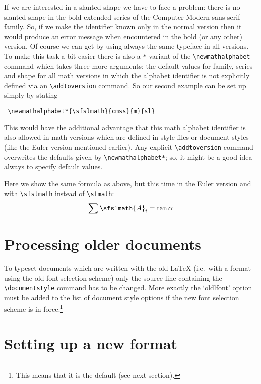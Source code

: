  If we are interested in a slanted shape we have to face a
 problem: there is no slanted shape in the bold extended series of the
 Computer Modern sans serif family.  So, if we make the identifier
 known only in the normal version then it would produce an error message
 when encountered in the bold (or any other) version. Of course we
 can get by
 using always
 the same typeface in all
 versions.  To make this task a bit easier there is also a \verb+*+
  variant
 of the \verb+\newmathalphabet+ command which takes three more
 arguments: the default values for family, series and shape for all
 math versions in which the alphabet identifier is not explicitly
 defined via an \verb+\addtoversion+ command. So our second example
 can be set up simply by stating
\begin{verbatim}
 \newmathalphabet*{\sfslmath}{cmss}{m}{sl}
\end{verbatim}
 This would have the additional advantage that this math alphabet
 identifier is also allowed in math versions which are defined in style
 files or document styles (like the Euler version mentioned earlier).
 Any explicit \verb+\addtoversion+ command overwrites the defaults
 given by \verb+\newmathalphabet*+; so, it might be a good idea always
 to specify default values.
 
 Here we show the same formula as above, but this time in the Euler
 version and with \verb+\sfslmath+ instead of \verb+\sfmath+:
\[  \sum \sfslmath{A}_{i} = \tan \alpha \]
 
 \section{Processing older documents}
 \label{sec:oldlfont}
 
 To typeset documents which are written with the old \LaTeX{}
 (i.e.\ with a format using the old font selection scheme)
  only the source line containing the
 \verb+\documentstyle+ command has to be changed.
 More exactly the `oldlfont' option must be added to the list of
 document style options if the new font selection scheme is in
 force.\footnote{This means that it is the default
                (see next section).}
 
 
 \section{Setting up a new format}
 \label{sec:formats}
 
